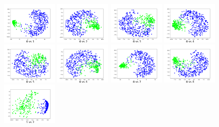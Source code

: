 \includegraphics[height=2cm]{./figs/0vs1.png}
\includegraphics[height=2cm]{./figs/0vs2.png}
\includegraphics[height=2cm]{./figs/0vs3.png}
\includegraphics[height=2cm]{./figs/0vs4.png}
\includegraphics[height=2cm]{./figs/0vs5.png}
\includegraphics[height=2cm]{./figs/0vs6.png}
\includegraphics[height=2cm]{./figs/0vs7.png}
\includegraphics[height=2cm]{./figs/0vs8.png}
\includegraphics[height=2cm]{./figs/1vs2.png}
